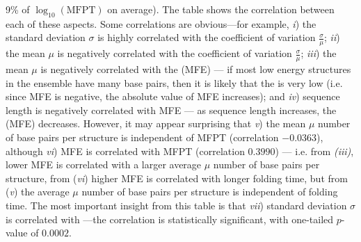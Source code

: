 \begin{table}[!ht]
{9\% of $\log_{10}(\text{MFPT})$ on average). The table shows the correlation between each of these aspects.
Some correlations are obvious---for example,
{\em i})\;
the standard deviation $\sigma$ is highly correlated with the
coefficient of variation $\frac{\sigma}{\mu}$;
{\em ii})\;
the mean $\mu$ is negatively correlated with the
coefficient of variation $\frac{\sigma}{\mu}$;
{\em iii})\;
the mean $\mu$ is negatively correlated with the
\mfe (MFE) --- if most low energy structures in the ensemble
have many base pairs, then it is likely that the \mfe is very
low (i.e. since MFE is negative, the absolute value of MFE increases); and
{\em iv})\;
sequence length is negatively correlated with MFE --- as sequence length
increases, the \mfe (MFE) decreases.
However, it may appear surprising that
{\em v})\; the
mean $\mu$ number of base pairs per structure is independent of MFPT
(correlation $-0.0363$), although
{\em vi})\; MFE is correlated with MFPT
(correlation $0.3990$) --- i.e. from {\em (iii)},
lower MFE is correlated with a larger average $\mu$ number of base pairs per
structure, from ({\em vi})
higher MFE is correlated with longer folding time, but
from ({\em v}) the average $\mu$  number of base pairs per structure is
independent of folding time.
The most important insight from this table is that
{\em vii})\;
standard deviation $\sigma$ is correlated with \mfpt---the correlation is statistically significant, with one-tailed
$p$-value of $0.0002$.}
\label{table:correlationFFTborEmpty}
\end{table}

